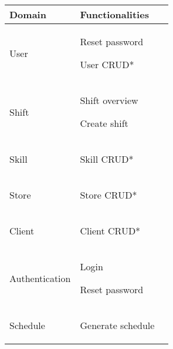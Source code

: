 \begin{tabularx}{\linewidth}{|>{}X|>{}X|>{}X|}
    \hline

    Domain
     &
    Functionalities
    \\ \hline

    User
     &
    \begin{compactitem}
        \item Reset password
        \item User CRUD*
    \end{compactitem}
    \\ \hline

    Shift
     &
    \begin{compactitem}
        \item Shift overview
        \item Create shift
    \end{compactitem}
    \\ \hline

    Skill
     &
    \begin{compactitem}
        \item Skill CRUD*
    \end{compactitem}
    \\ \hline

    Store
     &
    \begin{compactitem}
        \item Store CRUD*
    \end{compactitem}
    \\ \hline

    Client
     &
    \begin{compactitem}
        \item Client CRUD*
    \end{compactitem}
    \\ \hline

    Authentication
     &
    \begin{compactitem}
        \item Login
        \item Reset password
    \end{compactitem}
    \\ \hline

    Schedule
     &
    \begin{compactitem}
        \item Generate schedule
    \end{compactitem}
    \\ \hline


\end{tabularx}
